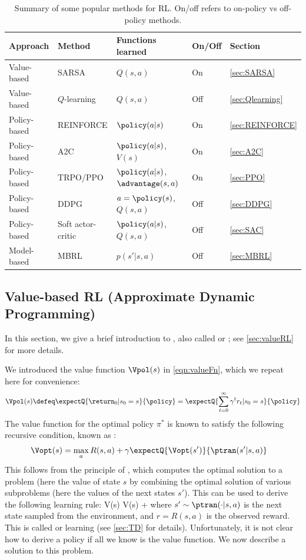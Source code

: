 \begin{table}
  \centering
\begin{tabular}{lllll}
Approach &  Method & Functions learned & On/Off & Section
  \\ \hline
Value-based &  SARSA & $Q(s,a)$ & On & \cref{sec:SARSA} \\          
Value-based &   $Q$-learning & $Q(s,a)$ & Off & \cref{sec:Qlearning} 
  \\ \hline
Policy-based &  REINFORCE & $\policy(a|s)$ & On & \cref{sec:REINFORCE} \\
Policy-based &   A2C & $\policy(a|s)$, $V(s)$ & On &  \cref{sec:A2C} \\      
Policy-based &   TRPO/PPO & $\policy(a|s)$, $\advantage(s,a)$ & On & \cref{sec:PPO} \\
Policy-based &   DDPG & $a=\policy(s)$, $Q(s,a)$ & Off & \cref{sec:DDPG} \\
Policy-based &   Soft actor-critic & $\policy(a|s)$, $Q(s,a)$ & Off & \cref{sec:SAC} 
  \\ \hline
Model-based &  MBRL & $p(s'|s,a)$ & Off & \cref{sec:MBRL}
\end{tabular}
\caption{
  Summary of some popular methods for RL.
  On/off refers to on-policy vs off-policy methods.
}
\label{tab:RL}
\end{table}


\subsection{Value-based RL (Approximate Dynamic Programming)}
\label{sec:rl-intro-valuebased}

In this section, we give a brief introduction to ,
also called  or ;
see \cref{sec:valueRL} for more details.

We introduced the value function $\Vpol(s)$ in \cref{eqn:valueFn},
which we repeat here for convenience:
\begin{align}
\Vpol(s)
\defeq \expectQ{\return_0 | s_0=s}{\policy}
=\expectQ{\sum_{t=0}^{\infty} \gamma^t r_{t} | s_0=s}{\policy}
\end{align}
The value function for the optimal policy $\pi^*$
is known to satisfy the following recursive condition,
known as 
:
\begin{align}
  \Vopt(s) &=
   \max_a R(s,a) + \gamma \expectQ{\Vopt(s')}{\ptran(s'|s,a)} 
\end{align}
This follows from the principle of ,
which computes the optimal solution to a problem (here the value of state $s$
by combining
the optimal solution of various subproblems (here the values
of the next states $s'$).
This can be used to derive the following learning rule:
\be
V(s) \leftarrow V(s) + \lr[r + \gamma V(s') - V(s)]
\ee
where $s' \sim \ptran(\cdot|s,a)$
is the next state sampled from the environment,
and $r=R(s,a)$ is the observed reward.
This is called   or  learning
(see \cref{sec:TD} for details).
Unfortunately,  it is not clear how to derive a policy if all we know is the
value function.
We now describe a solution to this problem.

